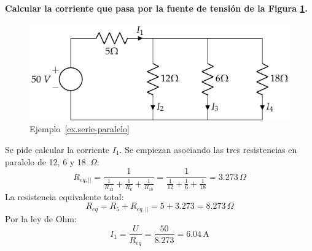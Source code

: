 	
	\begin{example}\label{ex.serie-paralelo}
          \textbf{Calcular la corriente que pasa por la fuente de
            tensión de la Figura \ref{fig:ejercicio1_tema1}.}
          \begin{figure}[H]
            \centering \includegraphics{../figs/ej1_BT1.pdf}
            \caption{Ejemplo~\ref{ex.serie-paralelo}}
            \label{fig:ejercicio1_tema1}
          \end{figure}
		
          Se pide calcular la corriente $I_1$. Se empiezan asociando
          las tres resistencias en paralelo de 12, 6 y 18~$\Omega$:
          \begin{equation*}
            R_{eq,||}=\dfrac{1}{\frac{1}{R_{12}}+\frac{1}{R_{6}}+\frac{1}{R_{18}}}=\dfrac{1}{\frac{1}{12}+\frac{1}{6}+\frac{1}{18}}=3.273\,\Omega
          \end{equation*}
          La resistencia equivalente total:
          \begin{equation*}
            R_{eq}=R_5+R_{eq,||}=5+3.273=8.273\,\Omega
          \end{equation*}
          Por la ley de Ohm:
          \begin{equation*}
            I_1=\dfrac{U}{R_{eq}}=\dfrac{50}{8.273}={6.04\,\si{\ampere}}
          \end{equation*}
	\end{example}
	
	
	
